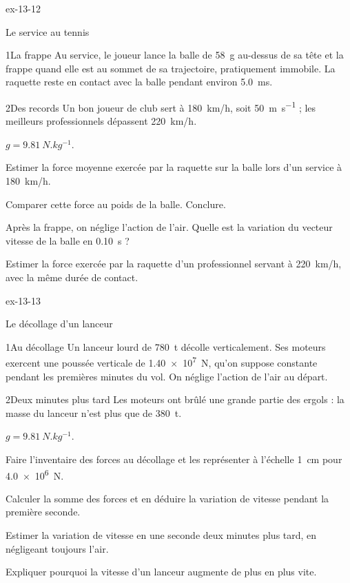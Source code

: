 \begin{blocLivre}{ex-13-12}
\begin{exercice}[3]{Le service au tennis}
\begin{docu}{1}{La frappe}
Au service, le joueur lance la balle de \qty{58}{g} au-dessus de sa tête et la frappe quand elle est au sommet de sa trajectoire,
pratiquement immobile. La raquette reste en contact avec la balle pendant environ \qty{5,0}{ms}.
\end{docu}
\begin{docu}{2}{Des records}
Un bon joueur de club sert à \qty{180}{km/h}, soit \qty{50}{m.s^{-1}} ; les meilleurs professionnels dépassent \qty{220}{km/h}.
\end{docu}
\begin{donnees}
$g=\qty{9,81}{N.kg^{-1}}$.
\end{donnees}
\begin{questions}
\item Estimer la force moyenne exercée par la raquette sur la balle lors d'un service à \qty{180}{km/h}.
\item Comparer cette force au poids de la balle. Conclure.
\item Après la frappe, on néglige l'action de l'air. Quelle est la variation du vecteur vitesse de la balle en \qty{0,10}{s} ?
\item \initiative Estimer la force exercée par la raquette d'un professionnel servant à \qty{220}{km/h}, avec la même durée de contact.
\end{questions}
\end{exercice}
\end{blocLivre}
\begin{blocLivre}{ex-13-13}
\begin{exercice}[3]{Le décollage d'un lanceur}
\begin{docu}{1}{Au décollage}
Un lanceur lourd de \qty{780}{t} décolle verticalement. Ses moteurs exercent une poussée verticale de \qty{1,40e7}{N}, qu'on suppose
constante pendant les premières minutes du vol. On néglige l'action de l'air au départ.
\end{docu}
\begin{docu}{2}{Deux minutes plus tard}
Les moteurs ont brûlé une grande partie des ergols : la masse du lanceur n'est plus que de \qty{380}{t}.
\end{docu}
\begin{donnees}
$g=\qty{9,81}{N.kg^{-1}}$.
\end{donnees}
\begin{questions}
\item Faire l'inventaire des forces au décollage et les représenter à l'échelle \qty{1}{cm} pour \qty{4,0e6}{N}.
\item Calculer la somme des forces et en déduire la variation de vitesse pendant la première seconde.
\item \initiative Estimer la variation de vitesse en une seconde deux minutes plus tard, en négligeant toujours l'air.
\item Expliquer pourquoi la vitesse d'un lanceur augmente de plus en plus vite.
\end{questions}
\end{exercice}
\end{blocLivre}
